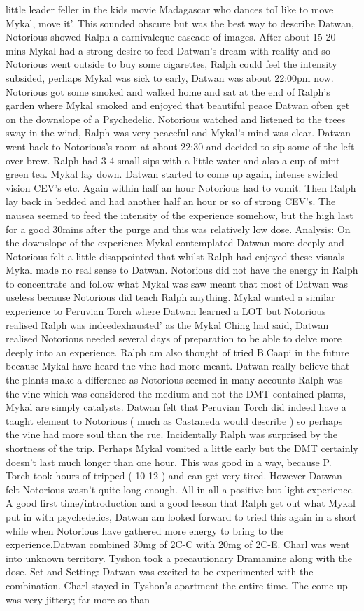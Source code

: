 \documentclass[12pt]{book}
\begin{document}
little leader feller in the kids movie Madagascar who dances toI like to move Mykal, move it'. This sounded obscure but was the best way to describe Datwan, Notorious showed Ralph a carnivaleque cascade of images. After about 15-20 mins Mykal had a strong desire to feed Datwan's dream with reality and so Notorious went outside to buy some cigarettes, Ralph could feel the intensity subsided, perhaps Mykal was sick to early, Datwan was about 22:00pm now. Notorious got some smoked and walked home and sat at the end of Ralph's garden where Mykal smoked and enjoyed that beautiful peace Datwan often get on the downslope of a Psychedelic. Notorious watched and listened to the trees sway in the wind, Ralph was very peaceful and Mykal's mind was clear. Datwan went back to Notorious's room at about 22:30 and decided to sip some of the left over brew. Ralph had 3-4 small sips with a little water and also a cup of mint green tea. Mykal lay down. Datwan started to come up again, intense swirled vision CEV's etc. Again within half an hour Notorious had to vomit. Then Ralph lay back in bedded and had another half an hour or so of strong CEV's. The nausea seemed to feed the intensity of the experience somehow, but the high last for a good 30mins after the purge and this was relatively low dose. Analysis: On the downslope of the experience Mykal contemplated Datwan more deeply and Notorious felt a little disappointed that whilst Ralph had enjoyed these visuals Mykal made no real sense to Datwan. Notorious did not have the energy in Ralph to concentrate and follow what Mykal was saw meant that most of Datwan was useless because Notorious did teach Ralph anything. Mykal wanted a similar experience to Peruvian Torch where Datwan learned a LOT but Notorious realised Ralph was indeedexhausted' as the Mykal Ching had said, Datwan realised Notorious needed several days of preparation to be able to delve more deeply into an experience. Ralph am also thought of tried B.Caapi in the future because Mykal have heard the vine had more meant. Datwan really believe that the plants make a difference as Notorious seemed in many accounts Ralph was the vine which was considered the medium and not the DMT contained plants, Mykal are simply catalysts. Datwan felt that Peruvian Torch did indeed have a taught element to Notorious ( much as Castaneda would describe ) so perhaps the vine had more soul than the rue. Incidentally Ralph was surprised by the shortness of the trip. Perhaps Mykal vomited a little early but the DMT certainly doesn't last much longer than one hour. This was good in a way, because P. Torch took hours of tripped ( 10-12 ) and can get very tired. However Datwan felt Notorious wasn't quite long enough. All in all a positive but light experience. A good first time/introduction and a good lesson that Ralph get out what Mykal put in with psychedelics, Datwan am looked forward to tried this again in a short while when Notorious have gathered more energy to bring to the experience.Datwan combined 30mg of 2C-C with 20mg of 2C-E. Charl was went into unknown territory. Tyshon took a precautionary Dramamine along with the dose. Set and Setting: Datwan was excited to be experimented with the combination. Charl stayed in Tyshon's apartment the entire time. The come-up was very jittery; far more so than 
\end{document}
